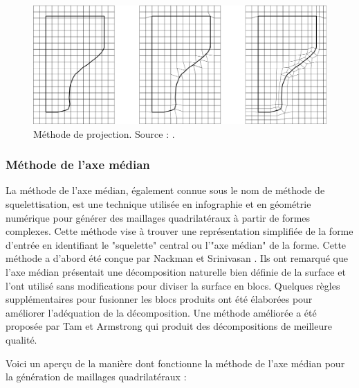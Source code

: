  \begin{figure}[!h]
    \centering
    \includegraphics[scale=0.4]{images/superpo_grid_2.png}
    \caption{Méthode de projection. Source : \cite{schneiders1996grid}.}
    \label{fig:superpo_grid_2}
\end{figure}

\subsubsection{Méthode de l'axe médian}

La méthode de l'axe médian, également connue sous le nom de méthode de squelettisation, est une technique utilisée en infographie et en géométrie numérique pour générer des maillages quadrilatéraux à partir de formes complexes. Cette méthode vise à trouver une représentation simplifiée de la forme d'entrée en identifiant le "squelette" central ou l'"axe médian" de la forme. Cette méthode a d'abord été conçue par Nackman et Srinivasan \cite{nackman1989method}. Ils ont remarqué que l'axe médian présentait une décomposition naturelle bien définie de la surface et l'ont utilisé sans modifications pour diviser la surface en blocs. Quelques règles supplémentaires pour fusionner les blocs produits ont été élaborées pour améliorer l'adéquation de la décomposition. Une méthode améliorée a été proposée par Tam et Armstrong \cite{tam19912d} qui produit des décompositions de meilleure qualité.

Voici un aperçu de la manière dont fonctionne la méthode de l'axe médian pour la génération de maillages quadrilatéraux :\\

